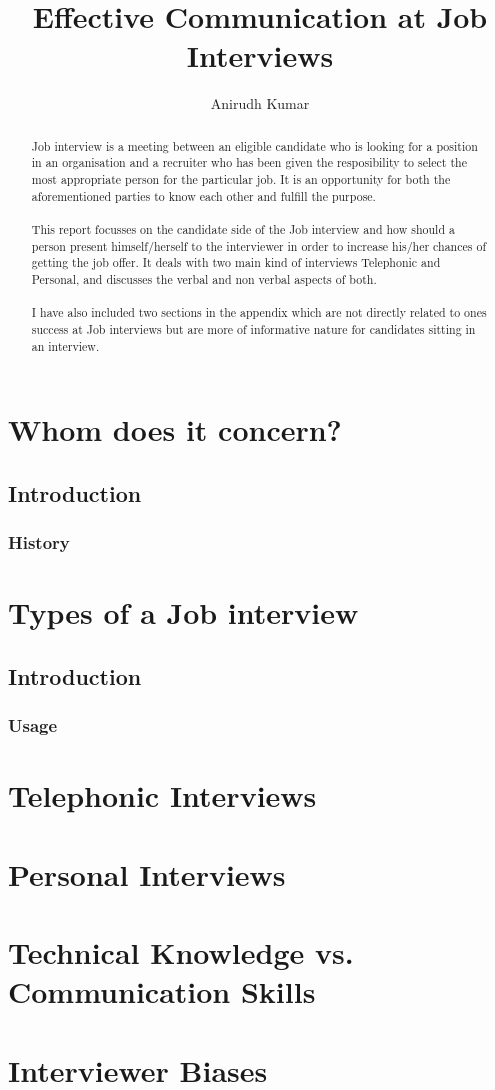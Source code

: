 \documentclass[a4paper,12pt]{report}
\title{Effective Communication at Job Interviews}
\author{Anirudh Kumar}
\begin{document}
\maketitle
\tableofcontents
\begin{abstract}
Job interview is a meeting between an eligible candidate who is looking for a position in an organisation and a recruiter who has been 
given the resposibility to select the most appropriate person for the particular job. It is an opportunity for both the aforementioned 
parties to know each other and fulfill the purpose. \\\\This report focusses on the candidate side of the Job interview and how should a person
present himself/herself to the interviewer in order to increase his/her chances of getting the job offer. It deals with two
main kind of interviews Telephonic and Personal, and discusses the verbal and non verbal aspects of both.\\\\
I have also included two sections in the appendix which are not directly related to ones success at Job interviews
but are more of informative nature for candidates sitting in an interview.
\end{abstract}
         
\chapter{Whom does it concern?}             %
\section{Introduction}     %
\subsection{History}       %

\chapter{Types of a Job interview}           %
\section{Introduction}     %
\subsection{Usage}         %

\chapter{Telephonic Interviews}
\chapter{Personal Interviews}
\appendix
\chapter{Technical Knowledge vs. Communication Skills}
\chapter{Interviewer Biases}
\begin{thebibliography}{9}
\end{thebibliography}
\end{document}
